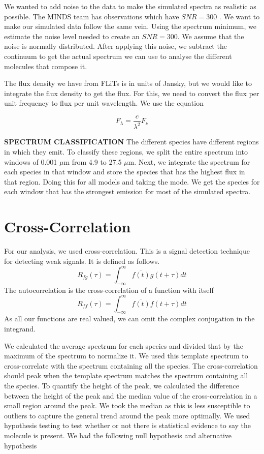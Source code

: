 \documentclass[twoside, single, authoryear, semicolon]{lion-msc}
\newcommand{\4}{$_4$}
\newcommand{\3}{$_3$}
\newcommand{\2}{$_2$}
\begin{document}
We wanted to add noise to the data to make the simulated spectra as realistic as possible. The MINDS team has observations which have $SNR = 300$ \citep{SOURCE}. We want to make our simulated data follow the same vein. Using the spectrum minimum, we estimate the noise level needed to create an $SNR = 300$. We assume that the noise is normally distributed. After applying this noise, we subtract the continuum to get the actual spectrum we can use to analyse the different molecules that compose it.


The flux density we have from FLiTs is in units of Jansky, but we would like to integrate the flux density to get the flux. For this, we need to convert the flux per unit frequency to flux per unit wavelength. We use the equation

\begin{equation}
    F_\lambda=\frac{c}{\lambda^2}F_\nu
\end{equation}

\textbf{SPECTRUM CLASSIFICATION}
The different species have different regions in which they emit. To classify these regions, we split the entire spectrum into windows of 0.001 $\mu$m from 4.9 to 27.5 $\mu$m. Next, we integrate the spectrum for each species in that window and store the species that has the highest flux in that region. Doing this for all models and taking the mode. We get the species for each window that has the strongest emission for most of the simulated spectra.  
\section{Cross-Correlation}
For our analysis, we used cross-correlation. This is a signal detection technique for detecting weak signals. It is defined as follows. 
\begin{equation}
    R_{fg}(\tau)=\int^\infty_{-\infty}\overline{f(t)}g(t+\tau)dt
\end{equation}
The autocorrelation is the cross-correlation of a function with itself
\begin{equation}
    R_{ff}(\tau)=\int^\infty_{-\infty}\overline{f(t)}f(t+\tau)dt
\end{equation}
As all our functions are real valued, we can omit the complex conjugation in the integrand.

We calculated the average spectrum for each species and divided that by the maximum of the spectrum to normalize it. We used this template spectrum to cross-correlate with the spectrum containing all the species. The cross-correlation should peak when the template spectrum matches the spectrum containing all the species. To quantify the height of the peak, we calculated the difference between the height of the peak and the median value of the cross-correlation in a small region around the peak. We took the median as this is less susceptible to outliers to capture the general trend around the peak more optimally. We used hypothesis testing to test whether or not there is statistical evidence to say the molecule is present. We had the following null hypothesis and alternative hypothesis
\end{document}
